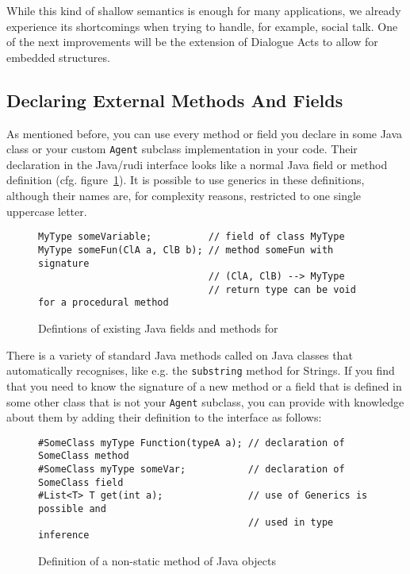 While this kind of shallow semantics is enough for many applications, we
already experience its shortcomings when trying to handle, for example, social
talk. One of the next improvements will be the extension of Dialogue Acts to
allow for embedded structures.


\subsection{Declaring External Methods And Fields}
\label{sec:javatypes}

As mentioned before, you can use every method or field you declare in
some Java class or your custom \texttt{Agent} subclass implementation
in your \vonda code. Their declaration in the Java/rudi interface
looks like a normal Java field or method definition
(cfg. figure~\ref{tab:javadef}). It is possible to use generics in
these definitions, although their names are, for complexity reasons,
restricted to one single uppercase letter.

\begin{figure}[htbp]
\small
\begin{lstlisting}
MyType someVariable;          // field of class MyType
MyType someFun(ClA a, ClB b); // method someFun with signature
                              // (ClA, ClB) --> MyType
                              // return type can be void for a procedural method
\end{lstlisting}\vspace*{-2ex}
\caption{\label{tab:javadef}Defintions of existing Java fields and methods for
  \vonda}
\end{figure}

There is a variety of standard Java methods called on Java classes that \vonda
automatically recognises, like e.g. the \texttt{substring} method for
Strings. If you find that you need \vonda to know the signature of a new method
or a field that is defined in some other class that is not your \texttt{Agent}
subclass, you can provide \vonda with knowledge about them by adding their
definition to the interface as follows:

\begin{figure}[htbp]
\centering
\small
\begin{lstlisting}
#SomeClass myType Function(typeA a); // declaration of SomeClass method
#SomeClass myType someVar;           // declaration of SomeClass field
#List<T> T get(int a);               // use of Generics is possible and
                                     // used in type inference
\end{lstlisting}\vspace*{-2ex}
\caption{\label{tab:methoddef}Definition of a non-static method of Java objects}
\end{figure}

